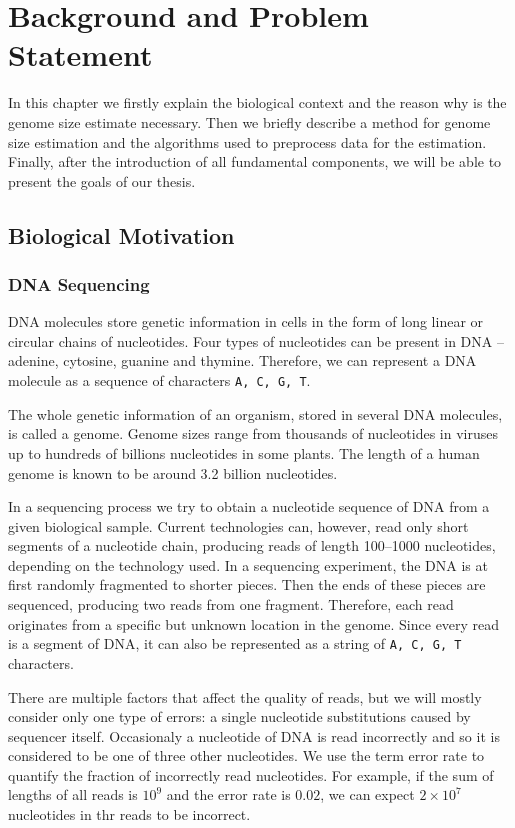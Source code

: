 \chapter{Background and Problem Statement}
In this chapter we firstly explain the biological context and the reason why is the genome size estimate necessary.
Then we briefly describe a method for genome size estimation and the algorithms used to preprocess data for the estimation.
Finally, after the introduction of all fundamental components, we will be able to present the goals of our thesis.

\section{Biological Motivation}

\subsection{DNA Sequencing}
\label{sec:sequencing}

DNA molecules store genetic information in cells in the form of long linear or circular chains of nucleotides.
Four types of nucleotides can be present in DNA -- adenine, cytosine, guanine and thymine.
Therefore, we can represent a DNA molecule as a sequence of characters \texttt{A, C, G, T}.

The whole genetic information of an organism, stored in several DNA molecules, is called a genome.
Genome sizes range from thousands of nucleotides in viruses up to hundreds of billions nucleotides in some plants.
The length of a human genome is known to be around 3.2 billion nucleotides.

In a sequencing process we try to obtain a nucleotide sequence of DNA from a given biological sample. 
Current technologies can, however, read only
short segments of a nucleotide chain, producing reads of length 100--1000 nucleotides, depending on the technology used. 
In a sequencing experiment, the DNA is at first randomly fragmented to shorter pieces. Then the ends of these pieces
are sequenced, producing two reads from one fragment. Therefore, each read originates from a specific but unknown
location in the genome. Since every read is a segment of DNA, it can also be represented as a string of
\texttt{A, C, G, T} characters.

There are multiple factors that affect the quality of reads, but we will mostly consider only one type of errors: 
a single nucleotide substitutions caused by sequencer itself. Occasionaly a nucleotide of DNA is
read incorrectly and so it is considered to be one of three other nucleotides. We use the term error rate to
quantify the fraction of incorrectly read nucleotides. For example, if the sum of lengths of all reads is $10^9$
and the error rate is $0.02$, we can expect $2 \times 10^7$ nucleotides in thr reads to be incorrect.

